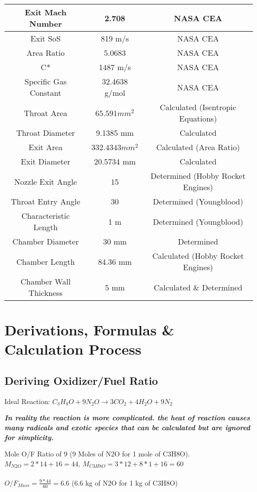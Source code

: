 \documentclass[12pt, letter paper]{article}
\begin{document}
\begin{center}
\begin{tabular}{|c |c |c |}
			Exit Mach Number & 2.708 & NASA CEA \\ \hline
			Exit SoS & 819 m/s & NASA CEA \\ \hline
			Area Ratio & 5.0683 & NASA CEA \\ \hline
			C* & 1487 m/s & NASA CEA \\ \hline
			Specific Gas Constant & 32.4638 g/mol & NASA CEA \\ \hline
			Throat Area & $ 65.591 mm^2 $ & Calculated (Isentropic Equations) \\ \hline
			Throat Diameter & 9.1385 mm & Calculated \\ \hline
			Exit Area & $ 332.4343 mm^2 $ & Calculated (Area Ratio) \\ \hline
			Exit Diameter & 20.5734 mm & Calculated \\ \hline
			Nozzle Exit Angle & 15\degree & Determined (Hobby Rocket Engines)\\ \hline
			Throat Entry Angle & 30\degree & Determined (Youngblood) \\ \hline
			Characteristic Length & 1 m & Determined (Youngblood) \\ \hline
			Chamber Diameter & 30 mm & Determined \\ \hline
			Chamber Length & 84.36 mm & Calculated (Hobby Rocket Engines) \\ \hline
			Chamber Wall Thickness & 5 mm & Calculated \& Determined \\ \hline
			
			
		\end{tabular}
	\end{center}

	\section{Derivations, Formulas \& Calculation Process}
		
		\subsection{Deriving Oxidizer/Fuel Ratio}
			Ideal Reaction: 
			$ C_3H_8O + 9N_2O \rightarrow 3CO_2 + 4H_2O + 9N_2 $ 
			\begin{center}
			\textbf{\textit{In reality the reaction is more complicated. the heat of reaction causes many radicals and exotic species that can be calculated but are ignored for simplicity.}} 
			\end{center}
			\noindent Mole O/F Ratio of 9 (9 Moles of N2O for 1 mole of C3H8O). \\
			$ M_{N2O} = 2*14 + 16 = 44 $, 
			$ M_{C3H8O} = 3*12 + 8*1 + 16 =60 $ \\ \\
			$O/F_{Mass} = \frac{9*44}{60} = 6.6 $ (6.6 kg of N2O for 1 kg of C3H8O)
		
\end{document}
